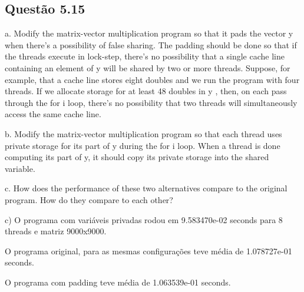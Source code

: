 
\subsection{Questão 5.15}

a. Modify the matrix-vector multiplication program so that it pads the vector y when there’s a possibility of false sharing. The padding should be done so that if the threads execute in lock-step, there’s no possibility that a single cache line containing an element of y will be shared by two or more threads. Suppose, for example, that a cache line stores eight doubles and we run the program with four threads. If we allocate storage for at least 48 doubles in y , then, on each pass through the for i loop, there’s no possibility that two
threads will simultaneously access the same cache line.

b. Modify the matrix-vector multiplication program so that each thread uses private storage for its part of y during the for i loop. When a thread is done computing its part of y, it should copy its private storage into the shared variable.

c. How does the performance of these two alternatives compare to the original program. How do they compare to each other?





c) O programa com variáveis privadas rodou em 9.583470e-02 seconds para 8 threads e matriz 9000x9000.

O programa original, para as mesmas configurações teve média de 1.078727e-01 seconds.

O programa com padding teve média de 1.063539e-01 seconds.

